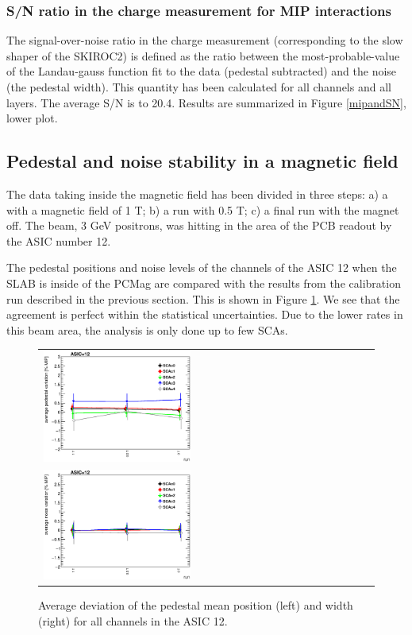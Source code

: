\documentclass[final,3p,times,twocolumn]{elsarticle}
\begin{document}
\subsubsection{S/N ratio in the charge measurement for MIP interactions}
\label{sec:sn}

The signal-over-noise ratio in the charge measurement (corresponding to the slow shaper of the SKIROC2) is defined 
as the ratio between the most-probable-value of
the Landau-gauss function fit to the data (pedestal subtracted) and the noise (the pedestal width). This quantity 
has been calculated for all channels and all layers. The average S/N is to 20.4.
Results are summarized in Figure \ref{mipandSN}, lower plot.

\subsection{Pedestal and noise stability in a magnetic field}
\label{sec:magnetic}

The data taking inside the magnetic field has been divided in three steps:
a) a with a magnetic field of 1 T; b) a run with 0.5 T; c) a final run with the magnet off.
The beam, 3 GeV positrons, was hitting in the area of the PCB readout by the ASIC number 12.

The pedestal positions and noise levels of the channels of the ASIC 12 when the
SLAB is inside of the PCMag are compared with the results from the calibration run described in the previous section.
This is shown in Figure \ref{pedestal_magnetic}.
We see that the agreement is perfect within the statistical uncertainties.
Due to the lower rates in this beam area, the
analysis is only done up to few SCAs.

\begin{figure}[!t]
  \centering
  \begin{tabular}{l}
    \includegraphics[width=0.45\textwidth]{../figs/pedestal/1T/summary_pedestal_chip12.eps} \\
    \includegraphics[width=0.45\textwidth]{../figs/pedestal/1T/summary_noise_chip12.eps}
  \end{tabular}
  \caption{Average deviation of the pedestal mean position (left) and width (right) for all channels in the ASIC 12.}
\label{pedestal_magnetic}
\end{figure}
\end{document}
